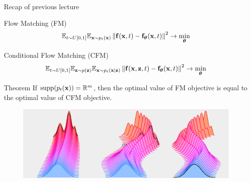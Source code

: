 \begin{frame}{Recap of previous lecture}
	\begin{block}{Flow Matching (FM)}
		\vspace{-0.5cm}
		\[
			\mathbb{E}_{t \sim U[0, 1]} \mathbb{E}_{\mathbf{x} \sim p_t(\mathbf{x})}\left\| \mathbf{f}(\mathbf{x}, t) - \mathbf{f}_{\boldsymbol{\theta}}(\mathbf{x}, t) \right\|^2 \rightarrow \min_{\boldsymbol{\theta}}
		\]
		\vspace{-0.5cm}
	\end{block}
	\begin{block}{Conditional Flow Matching (CFM)}
		\vspace{-0.5cm}
		\[
			\mathbb{E}_{t \sim U[0, 1]} \mathbb{E}_{\mathbf{z} \sim p(\mathbf{z})} \mathbb{E}_{\mathbf{x} \sim p_t(\mathbf{x} | \mathbf{z})}\left\| \mathbf{f}(\mathbf{x}, \mathbf{z}, t) - \mathbf{f}_{\boldsymbol{\theta}}(\mathbf{x}, t) \right\|^2 \rightarrow \min_{\boldsymbol{\theta}}
		\]
		\vspace{-0.5cm}
	\end{block}
	\begin{block}{Theorem}
		If $\text{supp}(p_t(\mathbf{x})) = \mathbb{R}^m$, then the optimal value of FM objective is equal to the optimal value of CFM objective.
	\end{block}
	\begin{figure}
		\centering
		\includegraphics[width=0.8\linewidth]{figs/multiple_dynamics}
	\end{figure}
\end{frame}

